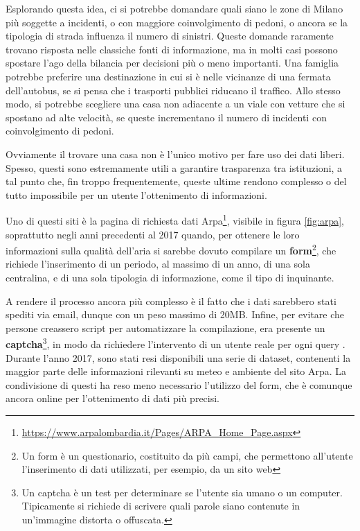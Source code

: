 \documentclass[a4paper,12pt]{report}
\newcommand{\skipline}{\vspace{0.2in}}
\begin{document}
Esplorando questa idea, ci si potrebbe domandare quali siano le zone 
di Milano più soggette a incidenti, o con maggiore coinvolgimento di pedoni, 
o ancora se la tipologia di strada influenza il numero di sinistri. 
Queste domande raramente trovano risposta nelle classiche fonti di informazione, 
ma in molti casi possono spostare l'ago della bilancia per decisioni più o meno 
importanti. 
Una famiglia potrebbe preferire una destinazione in cui si è nelle 
vicinanze di una fermata dell'autobus, se si pensa che i trasporti pubblici riducano 
il traffico. 
Allo stesso modo, si potrebbe scegliere una casa non adiacente 
a un viale con vetture che si spostano ad alte velocità, se queste incrementano 
il numero di incidenti con coinvolgimento di pedoni. 

\skipline
Ovviamente il trovare una casa non è l'unico motivo per fare uso dei dati liberi. 
Spesso, questi sono estremamente utili a garantire trasparenza tra istituzioni, 
a tal punto che, fin troppo frequentemente, queste ultime rendono complesso o 
del tutto impossibile per un utente l'ottenimento di informazioni. 

Uno di questi siti è la pagina di richiesta dati 
Arpa\footnote{\url{https://www.arpalombardia.it/Pages/ARPA_Home_Page.aspx}}, 
visibile in figura \ref{fig:arpa},
soprattutto negli anni precedenti al 2017 quando, per ottenere le loro informazioni 
sulla qualità dell'aria si sarebbe dovuto compilare un 
\textbf{form}\footnote{Un form è un questionario, costituito da più campi, che 
permettono all'utente l'inserimento di dati utilizzati, per esempio, da un sito web}, 
che richiede l'inserimento di un periodo, al massimo di un anno, di una sola 
centralina, e di una sola tipologia di informazione, come il tipo di inquinante. 

A rendere il processo ancora più complesso è il fatto che i dati sarebbero stati 
spediti via email, dunque con un peso massimo di 20MB. 
Infine, per evitare che persone creassero script per automatizzare la compilazione, 
era presente un \textbf{captcha}\footnote{Un captcha è un test per determinare se l'utente 
sia umano o un computer. Tipicamente si richiede di scrivere quali parole siano 
contenute in un'immagine distorta o offuscata.}, in modo da richiedere l'intervento 
di un utente reale per ogni query \cite{TRENTINI:1}. 
Durante l'anno 2017, sono stati resi disponibili una serie di dataset, contenenti la maggior 
parte delle informazioni rilevanti su meteo e ambiente del sito Arpa. 
La condivisione di questi ha reso meno necessario l'utilizzo del form, che 
è comunque ancora online per l'ottenimento di dati più precisi. 
\end{document}
